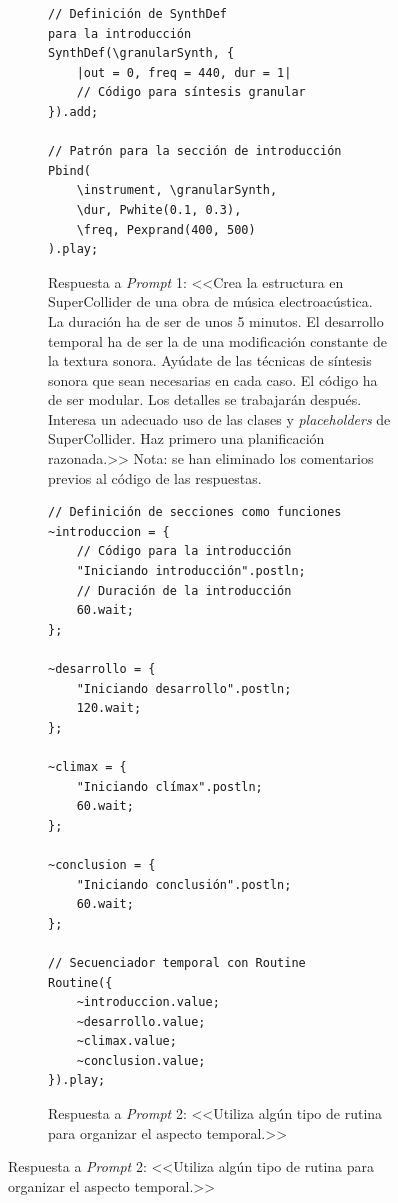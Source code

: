 \begin{figure}[H]
    \caption[Conversación con ChatGPT para crear una estructura general de una obra]{Conversación con ChatGPT para crear una estructura general de una obra.}
    \centering
    \begin{subfigure}{.48\textwidth}
    \centering
    \begin{lstlisting}[style=SuperCollider-IDE, basicstyle=\footnotesize\ttfamily, numbers=none]
// Definición de SynthDef 
para la introducción
SynthDef(\granularSynth, { 
    |out = 0, freq = 440, dur = 1|
    // Código para síntesis granular
}).add;

// Patrón para la sección de introducción
Pbind(
    \instrument, \granularSynth,
    \dur, Pwhite(0.1, 0.3),
    \freq, Pexprand(400, 500)
).play;
    \end{lstlisting}
    \caption{Respuesta a \emph{Prompt} 1: <<Crea la estructura en SuperCollider de una obra de música electroacústica.  La duración ha de ser de unos 5 minutos. El desarrollo temporal ha de ser la de una modificación constante de la textura sonora. Ayúdate de las técnicas de síntesis sonora que sean necesarias en cada caso. El código ha de ser modular. Los detalles se trabajarán después. Interesa un adecuado uso de las clases y \emph{placeholders} de SuperCollider. Haz primero una planificación razonada.>> Nota: se han eliminado los comentarios previos al código de las respuestas.}
    \end{subfigure}\hfill
    \begin{subfigure}{.48\textwidth}
    \centering
    \begin{lstlisting}[style=SuperCollider-IDE, basicstyle=\footnotesize\ttfamily, numbers=none]
// Definición de secciones como funciones
~introduccion = {
    // Código para la introducción
    "Iniciando introducción".postln;
    // Duración de la introducción
    60.wait;
};

~desarrollo = {
    "Iniciando desarrollo".postln;
    120.wait;
};

~climax = {
    "Iniciando clímax".postln;
    60.wait;
};

~conclusion = {
    "Iniciando conclusión".postln;
    60.wait;
};

// Secuenciador temporal con Routine
Routine({
    ~introduccion.value;
    ~desarrollo.value;
    ~climax.value;
    ~conclusion.value;
}).play;
    \end{lstlisting}
    \caption{Respuesta a \emph{Prompt} 2: <<Utiliza algún tipo de rutina para organizar el aspecto temporal.>>}
    \end{subfigure}
    \source{\propio}
    \label{fig:ChatGPT_esbozo_estructura}
\end{figure}

